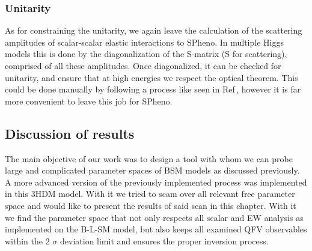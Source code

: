 \documentclass[10pt]{book}
\renewcommand{\(}{\left(}
\renewcommand{\)}{\right)}
\renewcommand{\[}{\left[}
\renewcommand{\]}{\right]}
\begin{document}
\subsubsection{Unitarity}

As for constraining the unitarity, we again leave the calculation of the scattering amplitudes of scalar-scalar elastic interactions to SPheno. 
%
In multiple Higgs models this is done by the diagonalization of the S-matrix (S for scattering), comprised of all these amplitudes.
%
Once diagonalized, it can be checked for unitarity, and ensure that at high energies we respect the optical theorem.  
%
This could be done manually by following a process like seen in Ref\,\cite{Moretti_2015}, however it is far more convenient to leave this job for SPheno. 

% 

%

\subsection{Discussion of results}

The main objective of our work was to design a tool with whom we can probe large and complicated parameter spaces of BSM models as discussed previously. 
%
A more advanced version of the previously implemented process was implemented in this 3HDM model.
%
With it we tried to scam over all relevant free parameter space and would like to present the results of said scan in this chapter. 
%
%
With it we find the parameter space that not only respects all scalar and EW analysis as implemented on the B-L-SM model, but also keeps all examined QFV observables within the 2 $\sigma$ deviation limit and ensures the proper inversion process. 
\end{document}
